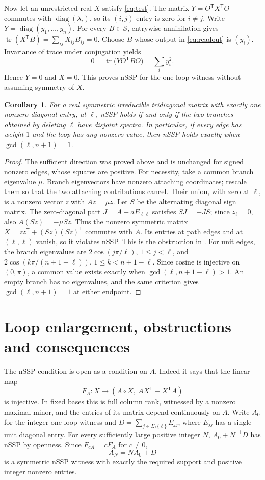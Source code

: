 \documentclass[11pt]{article}
\newtheorem{corollary}[theorem]{Corollary}
\newcommand{\diag}{\operatorname{diag}}
\newcommand{\tr}{\operatorname{tr}}
\begin{document}
Now let an unrestricted real $X$ satisfy \eqref{eq:test}.
The matrix $Y=O^{\mathsf T}X^{\mathsf T}O$ commutes with
$\diag(\lambda_i)$, so its $(i,j)$ entry is zero for $i\ne j$.
Write $Y=\diag(y_1,\ldots,y_n)$.
For every $B\in\mathcal S$, entrywise annihilation gives
$\tr(X^{\mathsf T}B)=\sum_{ij}X_{ij}B_{ij}=0$.
Choose $B$ whose output in \eqref{eq:readout} is $(y_i)$.
Invariance of trace under conjugation yields
\[
 0=\tr\bigl(YO^{\mathsf T}BO\bigr)=\sum_i y_i^2.
\]
Hence $Y=0$ and $X=0$. This proves nSSP for the one-loop witness
without assuming symmetry of $X$.

\begin{corollary}\label{cor:spectral}
For a real symmetric irreducible tridiagonal matrix with exactly one
nonzero diagonal entry, at $\ell$, nSSP holds if and only if the
two branches obtained by deleting $\ell$ have disjoint spectra.
In particular, if every edge has weight $1$ and the loop has any
nonzero value, then nSSP holds exactly when $\gcd(\ell,n+1)=1$.
\end{corollary}
\begin{proof}
The sufficient direction was proved above and is unchanged for signed
nonzero edges, whose squares are positive. For necessity, take a common
branch eigenvalue $\mu$. Branch eigenvectors have nonzero attaching
coordinates; rescale them so that the two attaching contributions
cancel. Their union, with zero at $\ell$, is a nonzero vector $z$ with
$Az=\mu z$. Let $S$ be the alternating diagonal sign matrix. The
zero-diagonal part $J=A-aE_{\ell\ell}$ satisfies $SJ=-JS$;
since $z_\ell=0$, also
$A(Sz)=-\mu Sz$. Thus the nonzero symmetric matrix
$X=zz^{\mathsf T}+(Sz)(Sz)^{\mathsf T}$ commutes with $A$.
Its entries at path edges and at $(\ell,\ell)$ vanish, so it
violates nSSP. This is the obstruction in \cite[Theorem 4.1]{C}.
For unit edges, the branch eigenvalues are
$2\cos(j\pi/\ell)$, $1\leq j<\ell$, and
$2\cos(k\pi/(n+1-\ell))$, $1\leq k<n+1-\ell$.
Since cosine is injective on $(0,\pi)$, a common value exists exactly
when $\gcd(\ell,n+1-\ell)>1$. An empty branch has no eigenvalues,
and the same criterion gives $\gcd(\ell,n+1)=1$ at either endpoint.
\end{proof}

\section{Loop enlargement, obstructions and consequences}
The nSSP condition is open as a condition on $A$. Indeed it says that
the linear map
\[
 F_A:X\longmapsto (A\circ X,\ AX^{\mathsf T}-X^{\mathsf T}A)
\]
is injective. In fixed bases this is full column rank, witnessed by a
nonzero maximal minor, and the entries of its matrix depend continuously
on $A$. Write $A_0$ for the integer one-loop witness and
$D=\sum_{j\in L\setminus\{\ell\}}E_{jj}$, where $E_{jj}$ has a single
unit diagonal entry. For every sufficiently large positive integer $N$,
$A_0+N^{-1}D$ has nSSP by openness. Since $F_{cA}=cF_A$ for $c\ne0$,
\[
 A_N=NA_0+D
\]
is a symmetric nSSP witness with exactly the required support and
positive integer nonzero entries.
\end{document}
